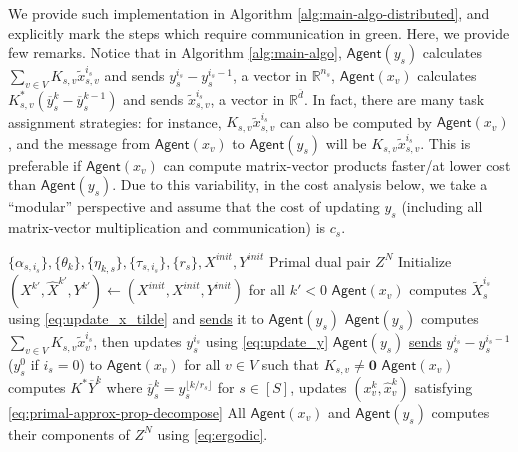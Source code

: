 \documentclass[10pt]{article}
\newcommand{\mb}{\mathbf}
\newcommand{\R}{\mathbb{R}}
\newcommand{\agent}{\mathsf{Agent}}
\begin{document}
We provide such implementation in Algorithm \ref{alg:main-algo-distributed}, and explicitly mark the steps which require communication in green. Here, we provide few remarks. Notice that in Algorithm \ref{alg:main-algo}, $\agent(y_s)$ calculates $\sum_{v\in V} K_{s,v}\widetilde{x}_{s,v}^{i_s}$ and sends $y_s^{i_s} - y_s^{i_s-1}$, a vector in $\R^{n_s}$, $\agent(x_v)$ calculates $K_{s,v}^*(\overline{y}_s^{k} -\overline{y}_s^{k-1}) $ and sends $\widetilde{x}_{s,v}^{i_s}$,
a vector in $\R^{\overline{d}}$. In fact, there are many task assignment strategies: for instance, $K_{s,v}\widetilde{x}_{s,v}^{i_s}$ can also be computed by $\agent(x_v)$, and the message from $\agent(x_v)$ to $\agent(y_s)$ will be $K_{s,v}\widetilde{x}_{s,v}^{i_s}$. This is preferable if $\agent(x_v)$ can compute matrix-vector products faster/at lower cost than $\agent(y_s)$. Due to this variability, in the cost analysis below, we take a ``modular'' perspective and assume that the cost of updating $y_s$ (including all matrix-vector multiplication and communication) is $c_s$. 




\begin{algorithm}
\caption{(Accelerated) Multi-timescale PDHG for distributed optimization}\label{alg:main-algo-distributed}
\begin{algorithmic}
\Require $\{\alpha_{s,i_s}\},\{\theta_k\},\{\eta_{k,s}\},\{\tau_{s,i_s}\},\{r_s\},X^{init},Y^{init}$
\Ensure Primal dual pair $Z^N$
\State Initialize $(X^{k'},\widehat{X}^{k'},Y^{k'})\gets (X^{init},X^{init},Y^{init})$ for all $k'< 0$
\For{ $v\in V$ such that $K_{s,v}\neq \mb 0$}
\State $\agent(x_v)$ computes $\widetilde{X}_{s}^{i_s}$ using \eqref{eq:update_x_tilde} and {\color{teal}\underline{sends}} it to $\agent(y_s)$
\EndFor
\State {\color{blue}{Dual update:}} $\agent(y_s)$ computes $\sum_{v\in V} K_{s,v}\widetilde{x}_{v}^{i_s}$, then updates $y_s^{i_s}$ using \eqref{eq:update_y} 
\State $\agent(y_s)$ {\color{teal}\underline{sends}} $y_s^{i_s}-y_s^{i_s-1}$ ($y_s^0$ if $i_s=0$)
to $\agent(x_v)$ for all $v\in V$ such that $K_{s,v}\neq \mb 0$
\EndFor
{}
\State {\color{red}{Primal update:}} $\agent(x_v)$ computes $K^*\overline{Y}^k$ where $\overline{y}_s^k = y_s^{\lfloor k/r_s\rfloor}$ for $s\in [S]$, updates $(x_v^k,\widehat{x}_v^k)$ satisfying \eqref{eq:primal-approx-prop-decompose} 
\EndFor 
\EndFor
\State All $\agent(x_v)$ and $\agent(y_s)$ computes their components of $Z^N$ using \eqref{eq:ergodic}. 
\end{algorithmic}
\end{algorithm}
\end{document}
